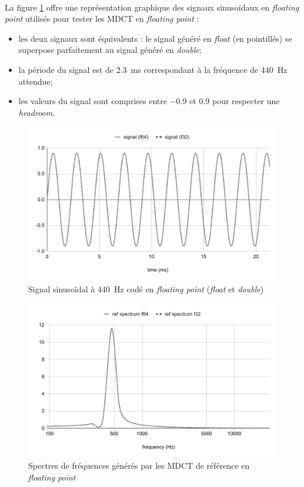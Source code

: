 \documentclass{article}
\begin{document}
    \paragraph{}
    La figure \ref{fig:signal_f32_f64} offre une représentation graphique des signaux sinusoïdaux en \emph{floating point} utilisés pour tester les MDCT en \emph{floating point} :
    \begin{itemize}
        \item les deux signaux sont équivalents : le signal généré en \emph{float} (en pointillés) se superpose parfaitement au signal généré en \emph{double};
        \item la période du signal est de \SI{2.3}{\milli\second} correspondant à la fréquence de \SI{440}{\hertz} attendue;
        \item les valeurs du signal sont comprises entre $-0.9$ et $0.9$ pour respecter une \emph{headroom}.
    \end{itemize}

    \begin{figure}[H]
        \centering
        \includegraphics[width=.8\linewidth]{./images/signal_f32_f64.pdf}
        \caption{Signal sinusoïdal à \SI{440}{\hertz} codé en \emph{floating point} (\emph{float} et \emph{double})}
        \label{fig:signal_f32_f64}
    \end{figure}

    \begin{figure}[H]
        \centering
        \includegraphics[width=.8\linewidth]{./images/validation_ref_float.pdf}
        \caption{Spectres de fréquences générés par les MDCT de référence en \emph{floating point}}
        \label{fig:validation_ref_mdct_float}
    \end{figure}
\end{document}
